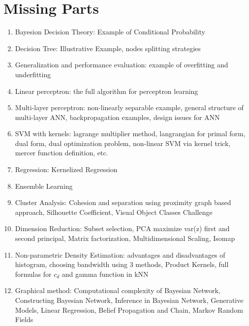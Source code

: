 \chapter{Missing Parts}

\begin{enumerate}
    \item Bayesion Decision Theory: Example of Conditional Probability
    \item Decision Tree: Illustrative Example, nodes splitting strategies
    \item Generalization and performance evaluation: example of overfitting and underfitting 
    \item Linear perceptron: the full algorithm for perceptron learning
    \item Multi-layer perceptron: non-linearly separable example, general structure of multi-layer ANN, backpropagation examples, design issues for ANN
    \item SVM with kernels: lagrange multiplier method, langrangian for primal form, dual form, dual optimization problem, non-linear SVM via kernel trick, mercer function definition, etc.
    \item Regression: Kernelized Regression
    \item Ensemble Learning
    \item Cluster Analysis: Cohesion and separation using proximity graph based approach, Silhouette Coefficient, Visual Object Classes Challenge
    \item Dimension Reduction: Subset selection, PCA maximize var(z) first and second principal, Matrix factorization, Multidimensional Scaling, Isomap
    \item Non-parametric Density Estimation: advantages and disadvantages of histogram, choosing bandwidth using 3 methods, Product Kernels, full formulas for $c_d$ and gamma function in kNN
    \item Graphical method: Computational complexity of Bayesian Network, Constructing Bayesian Network, Inference in Bayesian Network, Generative Models, Linear Regression, Belief Propagation and Chain, Markov Random Fields
\end{enumerate}
